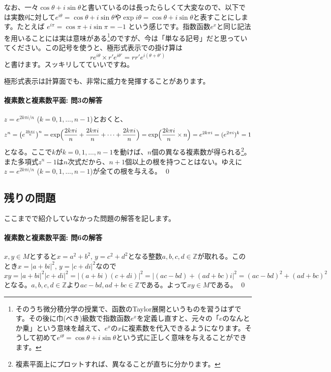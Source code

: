 なお、一々$\cos\theta+i\sin\theta$と書いているのは長ったらしくて大変なので、以下では実数$\theta$に対して$e^{i\theta} = \cos\theta + i \sin\theta$や$\exp i\theta = \cos\theta + i \sin\theta$と表すことにします。たとえば
$e^{i\pi} = \cos\pi + i\sin\pi = -1$
という感じです。指数函数$e^x$と同じ記法を用いることには実は意味がある\footnote{そのうち微分積分学の授業で、函数のTaylor展開というものを習うはずです。その後に巾(べき)級数で指数函数$e^x$を定義し直すと、元々の「$e$のなんとか乗」という意味を越えて、$e^x$の$x$に複素数を代入できるようになります。そうして初めて$e^{i\theta}=\cos\theta+i\sin\theta$という式に正しく意味を与えることができます。}のですが、今は「単なる記号」だと思っていてください。この記号を使うと、極形式表示での掛け算は
\[
re^{i\theta} \times r'e^{i\theta'} = rr'e^{i(\theta+\theta')}
\]
と書けます。スッキリしてていいですね。

極形式表示は計算面でも、非常に威力を発揮することがあります。


\paragraph{複素数と複素数平面: 問3の解答} $z=e^{2k\pi i/n}$ ($k=0,1,\ldots,n-1$)とおくと、
\[
z^n = \bigl(e^{\frac{2k\pi i}{n}}\bigr)^n = \exp\Bigl(\frac{2k\pi i}{n}+\frac{2k\pi i}{n}+\cdots+\frac{2k\pi i}{n}\Bigr) = \exp \Bigl(\frac{2k\pi i}{n} \times n\Bigr) = e^{2k\pi i} = (e^{2\pi i})^k = 1
\]
となる。ここで$k$が$k=0,1,\ldots,n-1$を動けば、$n$個の異なる複素数が得られる\footnote{複素平面上にプロットすれば、異なることが直ちに分かります。}。また多項式$z^n-1$は$n$次式だから、$n+1$個以上の根を持つことはない。ゆえに$z=e^{2k\pi i/n}$ ($k=0,1,\ldots,n-1$)が全ての根を与える。 \qed

\subsection{残りの問題}

ここまでで紹介していなかった問題の解答を記します。

\paragraph{複素数と複素数平面: 問6の解答} 

$x,y\in M$とすると$x=a^2+b^2$, $y=c^2+d^2$となる整数$a,b,c,d\in\mathbb{Z}$が取れる。このとき$x=|a+bi|^2$, $y=|c+di|^2$なので$xy=|a+bi|^2|c+di|^2=|(a+bi)(c+di)|^2=|(ac-bd)+(ad+bc)i|^2=(ac-bd)^2+(ad+bc)^2$となる。$a,b,c,d\in\mathbb{Z}$より$ac-bd,ad+bc\in\mathbb{Z}$である。よって$xy\in M$である。 \qed

